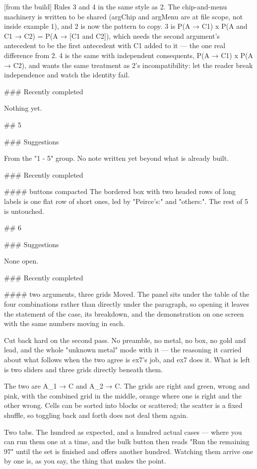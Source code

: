 [from the build] Rules 3 and 4 in the same style as 2. The chip-and-menu
machinery is written to be shared (argChip and argMenu are at file scope, not
inside example 1), and 2 is now the pattern to copy. 3 is P(A → C1) x
P(A and C1 → C2) = P(A → [C1 and C2]), which needs the second argument's
antecedent to be the first antecedent with C1 added to it — the one real
difference from 2. 4 is the same with independent consequents, P(A → C1) x
P(A → C2), and wants the same treatment as 2's incompatibility: let the reader
break independence and watch the identity fail.

### Recently completed

Nothing yet.


## 5

### Suggestions

From the "1 - 5" group. No note written yet beyond what is already built.

### Recently completed

#### buttons compacted
The bordered box with two headed rows of long labels is one flat row of short
ones, led by "Peirce's:" and "others:". The rest of 5 is untouched.


## 6

### Suggestions

None open.

### Recently completed

#### two arguments, three grids
Moved. The panel sits under the table of the four combinations rather than
directly under the paragraph, so opening it leaves the statement of the case,
its breakdown, and the demonstration on one screen with the same numbers moving
in each.

Cut back hard on the second pass. No preamble, no metal, no box, no gold and
lead, and the whole "unknown metal" mode with it — the reasoning it carried
about what follows when the two agree is ex7's job, and ex7 does it. What is
left is two sliders and three grids directly beneath them.

The two are A_1 → C and A_2 → C. The grids are right and green, wrong and pink,
with the combined grid in the middle, orange where one is right and the other
wrong. Cells can be sorted into blocks or scattered; the scatter is a fixed
shuffle, so toggling back and forth does not deal them again.

Two tabs. The hundred as expected, and a hundred actual cases — where you can
run them one at a time, and the bulk button then reads "Run the remaining 97"
until the set is finished and offers another hundred. Watching them arrive one
by one is, as you say, the thing that makes the point.

